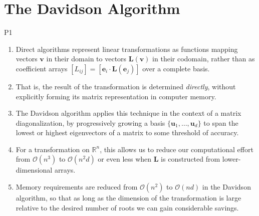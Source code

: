 \section{The Davidson Algorithm}
\label{sec:davidson:davidson}

P1
\begin{enumerate}
    \item
        Direct algorithms represent linear transformations as functions mapping
        vectors
        \(
            \mathbf{v}
        \)
        in their domain to vectors
        \(
            \mathbf{L}(\mathbf{v})
        \)
        in their codomain, rather than as coefficient arrays
        \(
            [L_{ij}]
            =
            [\mathbf{e}_i \cdot \mathbf{L}(\mathbf{e}_j)]
        \)
        over a complete basis.
    \item
        That is, the result of the transformation is determined {\itshape
        directly}, without explicitly forming its matrix representation in
        computer memory.
    \item
        The Davidson algorithm applies this technique in the context of a matrix
        diagonalization, by progressively growing a basis
        \(
            \{\mathbf{u}_1, \ldots,\mathbf{u}_d\}
        \)
        to span the lowest or highest eigenvectors of a matrix to some threshold
        of accuracy.
    \item
        For a transformation on \(\mathbb{R}^n\), this allows us to reduce our
        computational effort from \(\mathcal{O}(n^3)\) to \(\mathcal{O}(n^2 d)\)
        or even less when \(\mathbf{L}\) is constructed from lower-dimensional
        arrays.
    \item
        Memory requirements are reduced from \(\mathcal{O}(n^2)\) to
        \(\mathcal{O}(nd)\) in the Davidson algorithm, so that as long as the
        dimension of the transformation is large relative to the desired number
        of roots we can gain considerable savings.
\end{enumerate}

